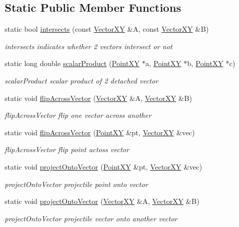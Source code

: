\subsection*{Static Public Member Functions}
\begin{DoxyCompactItemize}
\item 
static bool \hyperlink{classVectorXY_a585c00eaedb3c0af026cca3d155df34d}{intersects} (const \hyperlink{classVectorXY}{Vector\+X\+Y} \&A, const \hyperlink{classVectorXY}{Vector\+X\+Y} \&B)
\begin{DoxyCompactList}\small\item\em intersects indicates whether 2 vectors intersect or not \end{DoxyCompactList}\item 
static long double \hyperlink{classVectorXY_afd36ee1e0721ed9aea5cf47dbbca6f66}{scalar\+Product} (\hyperlink{classPointXY}{Point\+X\+Y} $\ast$a, \hyperlink{classPointXY}{Point\+X\+Y} $\ast$b, \hyperlink{classPointXY}{Point\+X\+Y} $\ast$c)
\begin{DoxyCompactList}\small\item\em scalar\+Product scalar product of 2 detached vector \end{DoxyCompactList}\item 
static void \hyperlink{classVectorXY_a61f4148fb8478296adb53e3f11e35bce}{flip\+Across\+Vector} (\hyperlink{classVectorXY}{Vector\+X\+Y} \&A, \hyperlink{classVectorXY}{Vector\+X\+Y} \&B)
\begin{DoxyCompactList}\small\item\em flip\+Across\+Vector flip one vector across another \end{DoxyCompactList}\item 
static void \hyperlink{classVectorXY_a07353914e6a38ea4426314d3997234e6}{flip\+Across\+Vector} (\hyperlink{classPointXY}{Point\+X\+Y} \&pt, \hyperlink{classVectorXY}{Vector\+X\+Y} \&vec)
\begin{DoxyCompactList}\small\item\em flip\+Across\+Vector flip point actoss vector \end{DoxyCompactList}\item 
static void \hyperlink{classVectorXY_a62651da7f0e1ef8cad09fb48e05488c4}{project\+Onto\+Vector} (\hyperlink{classPointXY}{Point\+X\+Y} \&pt, \hyperlink{classVectorXY}{Vector\+X\+Y} \&vec)
\begin{DoxyCompactList}\small\item\em project\+Onto\+Vector projectile point onto vector \end{DoxyCompactList}\item 
static void \hyperlink{classVectorXY_a79bb35dc0ea4090c75ed95123cb2c7f9}{project\+Onto\+Vector} (\hyperlink{classVectorXY}{Vector\+X\+Y} \&A, \hyperlink{classVectorXY}{Vector\+X\+Y} \&B)
\begin{DoxyCompactList}\small\item\em project\+Onto\+Vector projectile vector onto another vector \end{DoxyCompactList}\end{DoxyCompactItemize}
